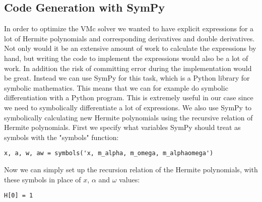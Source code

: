 \documentclass[../main.tex]{subfiles}
\begin{document}
\begin{appendices}
\chapter{Code Generation with SymPy}

In order to optimize the VMc solver we wanted to have explicit expressions for a lot of Hermite polynomials and corresponding derivatives and double derivatives. Not only would it be an extensive amount of work to calculate the expressions by hand, but writing the code to implement the expressions would also be a lot of work. In addition the risk of committing error during the implementation would be great. Instead we can use SymPy\cite{SymPy} for this task, which is a Python library for symbolic mathematics. This means that we can for example do symbolic differentiation with a Python program. This is extremely useful in our case since we need to symbolically differentiate a lot of expressions. We also use SymPy to symbolically calculating new Hermite polynomials using the recursive relation of Hermite polynomials. First we specify what variables SymPy should treat as symbols with the "symbols" function:
\lstset{language=python}
\begin{lstlisting}[caption={}]
x, a, w, aw = symbols('x, m_alpha, m_omega, m_alphaomega')
\end{lstlisting}
Now we can simply set up the recursion relation of the Hermite polynomials, with these symbols in place of $x$, $\alpha$ and $\omega$ values:
\lstset{language=python}
\begin{lstlisting}[caption={}]
H[0] = 1


\end{lstlisting}
\end{appendices}
\end{document}
